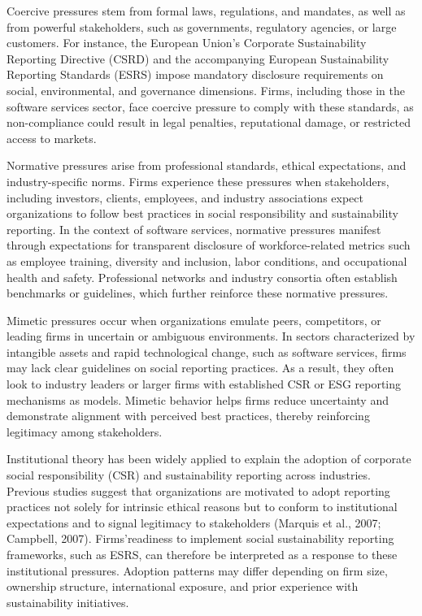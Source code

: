 Coercive pressures stem from formal laws, regulations, and mandates, as well as from powerful stakeholders, 
such as governments, regulatory agencies, or large customers. For instance, the European Union's Corporate 
Sustainability Reporting Directive (CSRD) and the accompanying European Sustainability Reporting Standards 
(ESRS) impose mandatory disclosure requirements on social, environmental, and governance dimensions. 
Firms, including those in the software services sector, face coercive pressure to comply with these standards, 
as non-compliance could result in legal penalties, reputational damage, or restricted access to markets.

Normative pressures arise from professional standards, ethical expectations, and industry-specific norms. 
Firms experience these pressures when stakeholders, including investors, clients, employees, and industry 
associations expect organizations to follow best practices in social responsibility and sustainability 
reporting. In the context of software services, normative pressures manifest through expectations for 
transparent disclosure of workforce-related metrics such as employee training, diversity and inclusion, 
labor conditions, and occupational health and safety. Professional networks and industry consortia often 
establish benchmarks or guidelines, which further reinforce these normative pressures.

Mimetic pressures occur when organizations emulate peers, competitors, or leading firms in uncertain or 
ambiguous environments. In sectors characterized by intangible assets and rapid technological change, 
such as software services, firms may lack clear guidelines on social reporting practices. As a result, 
they often look to industry leaders or larger firms with established CSR or ESG reporting mechanisms as models. 
Mimetic behavior helps firms reduce uncertainty and demonstrate alignment with perceived best practices, 
thereby reinforcing legitimacy among stakeholders.

Institutional theory has been widely applied to explain the adoption of corporate social responsibility 
(CSR) and sustainability reporting across industries. Previous studies suggest that organizations are 
motivated to adopt reporting practices not solely for intrinsic ethical reasons but to conform to institutional 
expectations and to signal legitimacy to stakeholders (Marquis et al., 2007; Campbell, 2007). Firms'readiness 
to implement social sustainability reporting frameworks, such as ESRS, can therefore be interpreted as a response 
to these institutional pressures. Adoption patterns may differ depending on firm size, ownership structure, 
international exposure, and prior experience with sustainability initiatives.


